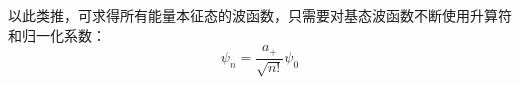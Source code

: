 以此类推，可求得所有能量本征态的波函数，只需要对基态波函数不断使用升算符和归一化系数：%
\begin{equation}
\psi_n = \frac{a_+}{\sqrt {n!}} \psi_0
\end{equation}






